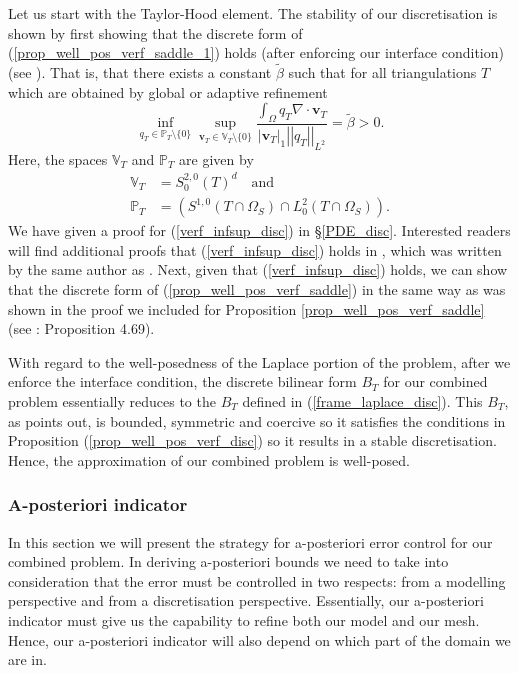 \documentclass[12pt,a4paper]{article}
\theoremstyle{definition}
\begin{document}
  Let us start with the Taylor-Hood element.   The stability of our discretisation is shown by first showing that the discrete form  of (\ref{prop_well_pos_verf_saddle_1})  holds (after enforcing our interface condition) (see \cite[\S4.10.2]{verfurth2013posteriori}).  That is, that there exists a constant $\widetilde{\beta}$ such that for all triangulations $T$ which are obtained by global or adaptive refinement 
  \begin{equation}\label{verf_infsup_disc}
  \inf_{q_T\in \mathbb{P}_T\setminus \lbrace 0 \rbrace}\sup_{\textbf{v}_T\in \mathbb{V}_T\setminus \lbrace 0 \rbrace}\frac{\int_{\Omega}q_T\nabla\cdot\textbf{v}_T}{\left|\textbf{v}_T\right|_1 \left|\left|q_T\right|\right|_{L^2}}=\widetilde{\beta}>0.
  \end{equation}
 Here, the spaces $\mathbb{V}_T$ and $\mathbb{P}_T$ are given by 
 \begin{equation}
 \begin{aligned}
 \mathbb{V}_T&=S_0^{2,0}\left(T\right)^d\quad\text{and}\\
\mathbb{P}_T&=\left(S^{1,0}\left(T\cap\Omega_S\right)\cap L^2_0\left(T\cap\Omega_S\right)\right).
 \end{aligned}\nonumber
 \end{equation}
 We have given a proof for (\ref{verf_infsup_disc}) in \S \ref{PDE_disc}.  Interested readers will find additional proofs that (\ref{verf_infsup_disc}) holds in \cite{verfurth1984error}, which was written by the same author as \cite{verfurth2013posteriori}.  Next, given that (\ref{verf_infsup_disc}) holds, we can show that the discrete form of (\ref{prop_well_pos_verf_saddle}) in the same way as was shown in the proof we included for Proposition \ref{prop_well_pos_verf_saddle} (see \cite[\S4.10.1]{verfurth2013posteriori}: Proposition 4.69).  
 
 With regard to the well-posedness of the Laplace portion of the problem, after we enforce the interface condition,  the discrete bilinear form $B_T$ for our combined problem essentially reduces to the $B_T$ defined in (\ref{frame_laplace_disc}). This $B_T$, as \cite{verfurth2013posteriori} points out, is bounded, symmetric and coercive so it satisfies the conditions in Proposition (\ref{prop_well_pos_verf_disc}) so it results in a stable discretisation.
 Hence, the approximation of our combined problem is well-posed. 

\subsubsection{A-posteriori indicator}
In this section we will present the strategy for a-posteriori error control for our combined problem.  In deriving a-posteriori bounds we need to take into consideration that the error must be controlled in two respects: from a modelling perspective and from a discretisation perspective.  Essentially, our a-posteriori indicator must give us the capability to refine both our model and our mesh.  Hence, our a-posteriori indicator will also depend on which part of the domain we are in.  
\end{document}
